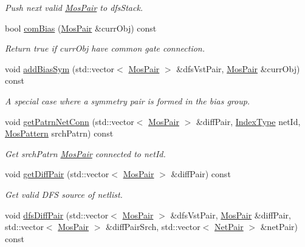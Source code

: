 \begin{DoxyCompactItemize}
\begin{DoxyCompactList}\small\item\em Push next valid \hyperlink{classMosPair}{Mos\+Pair} to dfs\+Stack. \end{DoxyCompactList}\item 
bool \hyperlink{classSymDetect_a13ddc56c5e937097178352eb00d71cf3}{com\+Bias} (\hyperlink{classMosPair}{Mos\+Pair} \&curr\+Obj) const
\begin{DoxyCompactList}\small\item\em Return true if curr\+Obj have common gate connection. \end{DoxyCompactList}\item 
void \hyperlink{classSymDetect_a79b9b8042087a413df53daf4e5600728}{add\+Bias\+Sym} (std\+::vector$<$ \hyperlink{classMosPair}{Mos\+Pair} $>$ \&dfs\+Vst\+Pair, \hyperlink{classMosPair}{Mos\+Pair} \&curr\+Obj) const
\begin{DoxyCompactList}\small\item\em A special case where a symmetry pair is formed in the bias group. \end{DoxyCompactList}\item 
void \hyperlink{classSymDetect_aa6d2ec13048f8f7e18e659bf8ac31dee}{get\+Patrn\+Net\+Conn} (std\+::vector$<$ \hyperlink{classMosPair}{Mos\+Pair} $>$ \&diff\+Pair, \hyperlink{type_8h_a581e8093e28e7362f2b6937296190676}{Index\+Type} net\+Id, \hyperlink{type_8h_af19eddb079bfea723256710b029c38e8}{Mos\+Pattern} srch\+Patrn) const
\begin{DoxyCompactList}\small\item\em Get srch\+Patrn \hyperlink{classMosPair}{Mos\+Pair} connected to net\+Id. \end{DoxyCompactList}\item 
void \hyperlink{classSymDetect_af04b93dac7e090cef8e741d8d1812485}{get\+Diff\+Pair} (std\+::vector$<$ \hyperlink{classMosPair}{Mos\+Pair} $>$ \&diff\+Pair) const
\begin{DoxyCompactList}\small\item\em Get valid D\+FS source of netlist. \end{DoxyCompactList}\item 
void \hyperlink{classSymDetect_a423022c08a31ef9361e1dfba843dc389}{dfs\+Diff\+Pair} (std\+::vector$<$ \hyperlink{classMosPair}{Mos\+Pair} $>$ \&dfs\+Vst\+Pair, \hyperlink{classMosPair}{Mos\+Pair} \&diff\+Pair, std\+::vector$<$ \hyperlink{classMosPair}{Mos\+Pair} $>$ \&diff\+Pair\+Srch, std\+::vector$<$ \hyperlink{classNetPair}{Net\+Pair} $>$ \&net\+Pair) const

\end{DoxyCompactItemize}
